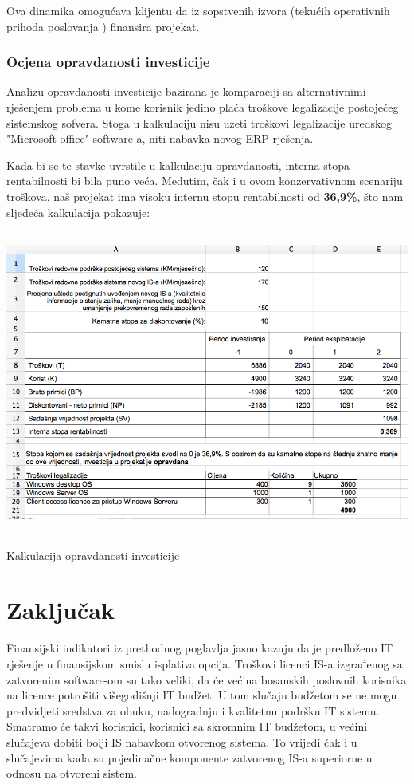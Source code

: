 \documentclass[times, utf8, seminar]{fit}
\begin{document}
Ova dinamika omogućava klijentu da iz sopstvenih izvora (tekućih operativnih prihoda poslovanja \cite{prasorep}) finansira projekat.

\subsection{Ocjena opravdanosti investicije}

Analizu opravdanosti investicije bazirana je komparaciji sa alternativnimi rješenjem problema u kome korisnik jedino plaća troškove legalizacije postojećeg sistemskog sofvera.
Stoga u kalkulaciju nisu uzeti troškovi legalizacije uredskog "Microsoft office" software-a, niti nabavka novog ERP rješenja.

Kada bi se te stavke uvrstile u kalkulaciju opravdanosti, interna stopa rentabilnosti bi bila puno veća. Međutim, čak i u ovom konzervativnom scenariju troškova, naš projekat ima visoku internu stopu rentabilnosti od \textbf{36,9\%}, što nam sljedeća kalkulacija pokazuje:

\begin{table}[!h]
\centering
\includegraphics[height=10cm]{img/kalk_opravdanost.png}
\caption{Kalkulacija opravdanosti investicije}
\end{table}

\chapter{Zaključak}

Finansijski indikatori iz prethodnog poglavlja jasno kazuju da je predloženo IT rješenje u finansijskom smislu isplativa opcija. Troškovi licenci IS-a izgrađenog sa zatvorenim software-om  su tako veliki, da će većina bosanskih poslovnih korisnika na licence potrošiti višegodišnji IT budžet. U tom slučaju budžetom se ne mogu predvidjeti sredstva za obuku, nadogradnju i kvalitetnu podršku IT sistemu. Smatramo će takvi korisnici, korisnici sa skromnim IT budžetom, u većini slučajeva dobiti bolji IS nabavkom otvorenog sistema. To vrijedi čak i u slučajevima kada su pojedinačne komponente zatvorenog IS-a superiorne u odnosu na otvoreni sistem.
\end{document}
